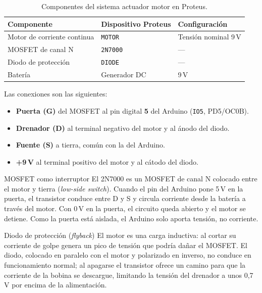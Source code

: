 \documentclass{upo-master}
\begin{document}
\begin{table}[htbp]
  \centering
  \caption{Componentes del sistema actuador motor en Proteus.}
  \label{tab:componentes}
  \begin{tabular}{lll}
    \toprule
    \textbf{Componente} & \textbf{Dispositivo Proteus} & \textbf{Configuración} \\
    \midrule
    Motor de corriente continua & \texttt{MOTOR}   & Tensión nominal 9\,V \\
    MOSFET de canal N           & \texttt{2N7000}  & --- \\
    Diodo de protección         & \texttt{DIODE}   & --- \\
    Batería                     & Generador DC     & 9\,V \\
    \bottomrule
  \end{tabular}
\end{table}

Las conexiones son las siguientes:
\begin{itemize}
  \item \textbf{Puerta (G)} del MOSFET al pin digital \textbf{5} del Arduino
        (\texttt{IO5}, PD5/OC0B).
  \item \textbf{Drenador (D)} al terminal negativo del motor y al ánodo del diodo.
  \item \textbf{Fuente (S)} a tierra, común con la del Arduino.
  \item \textbf{+9\,V} al terminal positivo del motor y al cátodo del diodo.
\end{itemize}

\begin{concepto}{MOSFET como interruptor}
El 2N7000 es un MOSFET de canal N colocado entre el motor y tierra
(\emph{low-side switch}). Cuando el pin del Arduino pone 5\,V en la puerta,
el transistor conduce entre D y S y circula corriente desde la batería a
través del motor. Con 0\,V en la puerta, el circuito queda abierto y el motor
se detiene. Como la puerta está aislada, el Arduino solo aporta tensión, no
corriente.
\end{concepto}

\begin{concepto}{Diodo de protección (\emph{flyback})}
El motor es una carga inductiva: al cortar su corriente de golpe genera un
pico de tensión que podría dañar el MOSFET. El diodo, colocado en paralelo con
el motor y polarizado en inverso, no conduce en funcionamiento normal; al
apagarse el transistor ofrece un camino para que la corriente de la bobina se
descargue, limitando la tensión del drenador a unos 0,7\,V por encima de la
alimentación.
\end{concepto}
\end{document}
